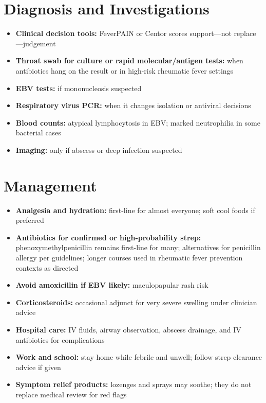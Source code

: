 \section*{Diagnosis and Investigations}
\begin{itemize}
    \item \textbf{Clinical decision tools:} FeverPAIN or Centor scores support---not replace---judgement
    \item \textbf{Throat swab for culture or rapid molecular/antigen tests:} when antibiotics hang on the result or in high-risk rheumatic fever settings
    \item \textbf{EBV tests:} if mononucleosis suspected
    \item \textbf{Respiratory virus PCR:} when it changes isolation or antiviral decisions
    \item \textbf{Blood counts:} atypical lymphocytosis in EBV; marked neutrophilia in some bacterial cases
    \item \textbf{Imaging:} only if abscess or deep infection suspected
\end{itemize}

\section*{Management}
\begin{itemize}
    \item \textbf{Analgesia and hydration:} first-line for almost everyone; soft cool foods if preferred
    \item \textbf{Antibiotics for confirmed or high-probability strep:} phenoxymethylpenicillin remains first-line for many; alternatives for penicillin allergy per guidelines; longer courses used in rheumatic fever prevention contexts as directed
    \item \textbf{Avoid amoxicillin if EBV likely:} maculopapular rash risk
    \item \textbf{Corticosteroids:} occasional adjunct for very severe swelling under clinician advice
    \item \textbf{Hospital care:} IV fluids, airway observation, abscess drainage, and IV antibiotics for complications
    \item \textbf{Work and school:} stay home while febrile and unwell; follow strep clearance advice if given
    \item \textbf{Symptom relief products:} lozenges and sprays may soothe; they do not replace medical review for red flags
\end{itemize}

